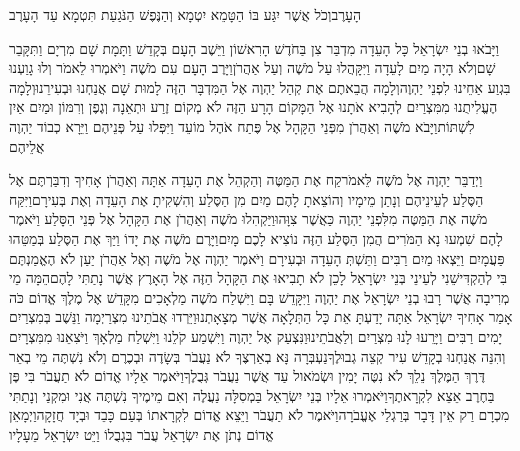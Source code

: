 \documentclass[../main/main.tex]{subfiles}
\begin{document}
\begin{multicols}{\ncols}
הָעָרֶב\PreVerseSpace{}וְכֹל אֲשֶׁר יִגַּע בּוֹ הַטָּמֵא יִטְמָא וְהַנֶּפֶשׁ הַנֹּגַעַת תִּטְמָא עַד הָעָרֶב\OpenSection{}\par
{}וַיָּבֹאוּ בְנֵי יִשְׂרָאֵל כָּל הָעֵדָה מִדְבַּר צִן בַּחֹדֶשׁ הָרִאשׁוֹן וַיֵּשֶׁב הָעָם בְּקָדֵשׁ וַתָּמָת שָׁם מִרְיָם וַתִּקָּבֵר שָׁם\PreVerseSpace{}וְלֹא הָיָה מַיִם לָעֵדָה וַיִּקָּהֲלוּ עַל מֹשֶׁה וְעַל אַהֲרֹן\PreVerseSpace{}וַיָּרֶב הָעָם עִם מֹשֶׁה וַיֹּאמְרוּ לֵאמֹר וְלוּ גָוַעְנוּ בִּגְוַע אַחֵינוּ לִפְנֵי יַהְוֶה\PreVerseSpace{}וְלָמָה הֲבֵאתֶם אֶת קְהַל יַהְוֶה אֶל הַמִּדְבָּר הַזֶּה לָמוּת שָׁם אֲנַחְנוּ וּבְעִירֵנוּ\PreVerseSpace{}וְלָמָה הֶעֱלִיתֻנוּ מִמִּצְרַיִם לְהָבִיא אֹתָנוּ אֶל הַמָּקוֹם הָרָע הַזֶּה לֹא מְקוֹם זֶרַע וּתְאֵנָה וְגֶפֶן וְרִמּוֹן וּמַיִם אַיִן לִשְׁתּוֹת\PreVerseSpace{}וַיָּבֹא מֹשֶׁה וְאַהֲרֹן מִפְּנֵי הַקָּהָל אֶל פֶּתַח אֹהֶל מוֹעֵד וַיִּפְּלוּ עַל פְּנֵיהֶם וַיֵּרָא כְבוֹד יַהְוֶה אֲלֵיהֶם\OpenSection{}\par
{}וַיְדַבֵּר יַהְוֶה אֶל מֹשֶׁה לֵּאמֹר\PreVerseSpace{}קַח אֶת הַמַּטֶּה וְהַקְהֵל אֶת הָעֵדָה אַתָּה וְאַהֲרֹן אָחִיךָ וְדִבַּרְתֶּם אֶל הַסֶּלַע לְעֵינֵיהֶם וְנָתַן מֵימָיו וְהוֹצֵאתָ לָהֶם מַיִם מִן הַסֶּלַע וְהִשְׁקִיתָ אֶת הָעֵדָה וְאֶת בְּעִירָם\PreVerseSpace{}וַיִּקַּח מֹשֶׁה אֶת הַמַּטֶּה מִלִּפְנֵי יַהְוֶה כַּאֲשֶׁר צִוָּהוּ\PreVerseSpace{}וַיַּקְהִלוּ מֹשֶׁה וְאַהֲרֹן אֶת הַקָּהָל אֶל פְּנֵי הַסָּלַע וַיֹּאמֶר לָהֶם שִׁמְעוּ נָא הַמֹּרִים הֲמִן הַסֶּלַע הַזֶּה נוֹצִיא לָכֶם מָיִם\PreVerseSpace{}וַיָּרֶם מֹשֶׁה אֶת יָדוֹ וַיַּךְ אֶת הַסֶּלַע בְּמַטֵּהוּ פַּעֲמָיִם וַיֵּצְאוּ מַיִם רַבִּים וַתֵּשְׁתְּ הָעֵדָה וּבְעִירָם \ClosedSection{}וַיֹּאמֶר יַהְוֶה אֶל מֹשֶׁה וְאֶל אַהֲרֹן יַעַן לֹא הֶאֱמַנְתֶּם בִּי לְהַקְדִּישֵׁנִי לְעֵינֵי בְּנֵי יִשְׂרָאֵל לָכֵן לֹא תָבִיאוּ אֶת הַקָּהָל הַזֶּה אֶל הָאָרֶץ אֲשֶׁר נָתַתִּי לָהֶם\PreVerseSpace{}הֵמָּה מֵי מְרִיבָה אֲשֶׁר רָבוּ בְנֵי יִשְׂרָאֵל אֶת יַהְוֶה וַיִּקָּדֵשׁ בָּם \ClosedSection{}וַיִּשְׁלַח מֹשֶׁה מַלְאָכִים מִקָּדֵשׁ אֶל מֶלֶךְ אֱדוֹם כֹּה אָמַר אָחִיךָ יִשְׂרָאֵל אַתָּה יָדַעְתָּ אֵת כָּל הַתְּלָאָה אֲשֶׁר מְצָאָתְנוּ\PreVerseSpace{}וַיֵּרְדוּ אֲבֹתֵינוּ מִצְרַיְמָה וַנֵּשֶׁב בְּמִצְרַיִם יָמִים רַבִּים וַיָּרֵעוּ לָנוּ מִצְרַיִם וְלַאֲבֹתֵינוּ\PreVerseSpace{}וַנִּצְעַק אֶל יַהְוֶה וַיִּשְׁמַע קֹלֵנוּ וַיִּשְׁלַח מַלְאָךְ וַיֹּצִאֵנוּ מִמִּצְרָיִם וְהִנֵּה אֲנַחְנוּ בְקָדֵשׁ עִיר קְצֵה גְבוּלֶךָ\PreVerseSpace{}נַעְבְּרָה נָּא בְאַרְצֶךָ לֹא נַעֲבֹר בְּשָׂדֶה וּבְכֶרֶם וְלֹא נִשְׁתֶּה מֵי בְאֵר דֶּרֶךְ הַמֶּלֶךְ נֵלֵךְ לֹא נִטֶּה יָמִין וּשְׂמֹאול עַד אֲשֶׁר נַעֲבֹר גְּבֻלֶךָ\PreVerseSpace{}וַיֹּאמֶר אֵלָיו אֱדוֹם לֹא תַעֲבֹר בִּי פֶּן בַּחֶרֶב אֵצֵא לִקְרָאתֶךָ\PreVerseSpace{}וַיֹּאמְרוּ אֵלָיו בְּנֵי יִשְׂרָאֵל בַּמְסִלָּה נַעֲלֶה וְאִם מֵימֶיךָ נִשְׁתֶּה אֲנִי וּמִקְנַי וְנָתַתִּי מִכְרָם רַק אֵין דָּבָר בְּרַגְלַי אֶעֱבֹרָה\PreVerseSpace{}וַיֹּאמֶר לֹא תַעֲבֹר וַיֵּצֵא אֱדוֹם לִקְרָאתוֹ בְּעַם כָּבֵד וּבְיָד חֲזָקָה\PreVerseSpace{}וַיְמָאֵן אֱדוֹם נְתֹן אֶת יִשְׂרָאֵל עֲבֹר בִּגְבֻלוֹ וַיֵּט יִשְׂרָאֵל מֵעָלָיו\OpenSection{}\par

\end{multicols}
\end{document}
